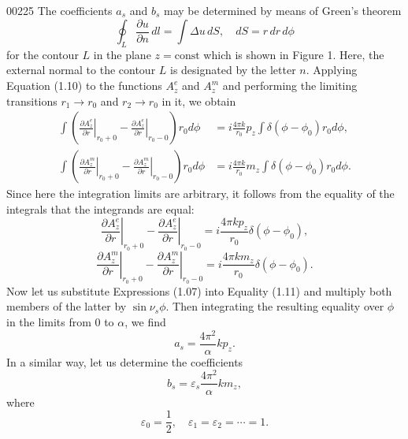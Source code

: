 \begin{scanpage}{0022}{5}
The coefficients $a_s$ and $b_s$ may be determined by means of Green's theorem
\[\oint_L\frac{\partial u}{\partial n}\,dl=\int\Delta u\,dS,\quad dS=r\,dr\,d\phi\tag{1.10}\]
for the contour $L$ in the plane $z=\mathrm{const}$ which is shown in Figure 1. Here, the external normal to the contour $L$ is designated by the letter $n$. Applying Equation (1.10) to the functions $A_z^e$ and $A_z^m$ and performing the limiting transitions $r_1\to r_0$ and $r_2\to r_0$ in it, we obtain
\[\begin{aligned}\int\left(\left.\frac{\partial A_z^e}{\partial r}\right|_{r_0+0}-\left.\frac{\partial A_z^e}{\partial r}\right|_{r_0-0}\right)r_0d\phi&=i\frac{4\pi k}{r_0}p_z\int\delta(\phi-\phi_0)r_0d\phi,\\\int\left(\left.\frac{\partial A_z^m}{\partial r}\right|_{r_0+0}-\left.\frac{\partial A_z^m}{\partial r}\right|_{r_0-0}\right)r_0d\phi&=i\frac{4\pi k}{r_0}m_z\int\delta(\phi-\phi_0)r_0d\phi.\end{aligned}\]
Since here the integration limits are arbitrary, it follows from the equality of the integrals that the integrands are equal:
\[\left.\frac{\partial A_z^e}{\partial r}\right|_{r_0+0}-\left.\frac{\partial A_z^e}{\partial r}\right|_{r_0-0}=i\frac{4\pi kp_z}{r_0}\delta(\phi-\phi_0),\tag{1.11}\]
\[\left.\frac{\partial A_z^m}{\partial r}\right|_{r_0+0}-\left.\frac{\partial A_z^m}{\partial r}\right|_{r_0-0}=i\frac{4\pi km_z}{r_0}\delta(\phi-\phi_0).\tag{1.12}\]
Now let us substitute Expressions (1.07) into Equality (1.11) and multiply both members of the latter by $\sin\nu_s\phi$. Then integrating the resulting equality over $\phi$ in the limits from $0$ to $\alpha$, we find
\[a_s=\frac{4\pi^2}{\alpha}kp_z.\tag{1.13}\]
In a similar way, let us determine the coefficients
\[b_s=\varepsilon_s\frac{4\pi^2}{\alpha}km_z,\tag{1.14}\]
where
\[\varepsilon_0=\frac12,\quad\varepsilon_1=\varepsilon_2=\cdots=1.\tag{1.15}\]
\end{scanpage}
